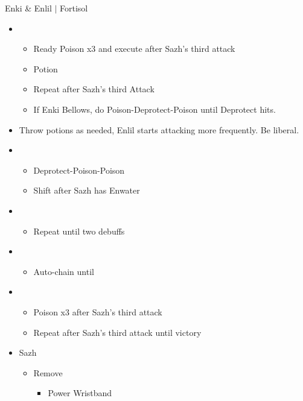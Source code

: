 \begin{battle}{Enki \& Enlil $|$ Fortisol}
\begin{multicols}{2}
\begin{itemize}
      \item \sixth
            \begin{itemize}
              \item Ready Poison x3 and execute after Sazh's third attack
              \item Potion
              \item Repeat after Sazh's third Attack
              \item If Enki Bellows, do Poison-Deprotect-Poison until Deprotect hits.
            \end{itemize}
      \item Throw potions as needed, Enlil starts attacking more frequently. Be liberal.
      \item \third
            \begin{itemize}
              \item Deprotect-Poison-Poison
              \item Shift after Sazh has Enwater
            \end{itemize}
      \item \fifth
            \begin{itemize}
              \item Repeat until two debuffs
            \end{itemize}
      \item \fourth
            \begin{itemize}
              \item Auto-chain until \stagger
            \end{itemize}
      \item \sixth
            \begin{itemize}
              \item Poison x3 after Sazh's third attack
              \item Repeat after Sazh's third attack until victory
            \end{itemize}
    \end{itemize}
    \vfill\null
  \end{multicols}
\end{battle}
\begin{menu}
  \begin{itemize}
    \equip
    \begin{itemize}
      \item Sazh
            \begin{itemize}
              \item Remove
                    \begin{itemize}
                      \item Power Wristband
                    \end{itemize}
            \end{itemize}
    \end{itemize}
  \end{itemize}
\end{menu}
